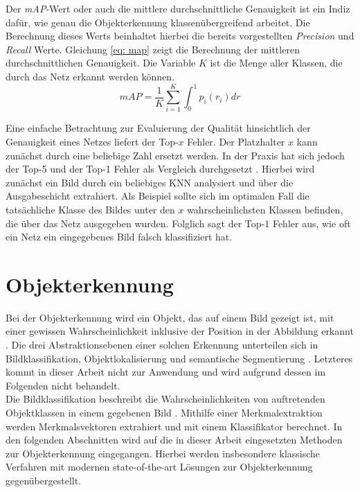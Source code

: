 		Der \textit{mAP}-Wert oder auch die mittlere durchschnittliche Genauigkeit ist ein Indiz dafür, wie genau die Objekterkennung klassenübergreifend arbeitet. Die Berechnung dieses Werts beinhaltet hierbei die bereits vorgestellten \textit{Precision} und \textit{Recall} Werte. Gleichung \ref{eq: map} zeigt die Berechnung der mittleren durchschnittlichen Genauigkeit. Die Variable $K$ ist die Menge aller Klassen, die durch das Netz erkannt werden können.  \\
		
		\begin{equation}
			mAP = \frac{1}{K}\sum_{i=1}^{K}\int_{0}^{1}p_i(r_i)dr
			\label{eq: map}
		\end{equation}\newpage
		
		Eine einfache Betrachtung zur Evaluierung der Qualität hinsichtlich der Genauigkeit eines Netzes liefert der Top-$x$ Fehler. Der Platzhalter $x$ kann zunächst durch eine beliebige Zahl ersetzt werden. In der Praxis hat sich jedoch der Top-5 und der Top-1 Fehler als Vergleich durchgesetzt \cite{cnnvergleich}. Hierbei wird zunächst ein Bild durch ein beliebiges KNN analysiert und über die Ausgabeschicht extrahiert. Als Beispiel sollte sich im optimalen Fall die tatsächliche Klasse des Bildes unter den $x$ wahrscheinlichsten Klassen befinden, die über das Netz ausgegeben wurden. Folglich sagt der Top-1 Fehler aus, wie oft ein Netz ein eingegebenes Bild falsch klassifiziert hat.
		
		
		
		
		
		
	\section{Objekterkennung}
	\label{sec: Objekterkennung}
	Bei der Objekterkennung wird ein Objekt, das auf einem Bild gezeigt ist, mit einer gewissen Wahrscheinlichkeit inklusive der Position in der Abbildung erkannt \cite{bildundobjekt}. Die drei Abstraktionsebenen einer solchen Erkennung unterteilen sich in Bildklassifikation, Objektlokalisierung und semantische Segmentierung \cite{bildundobjekt}. Letzteres kommt in dieser Arbeit nicht zur Anwendung und wird aufgrund dessen im Folgenden nicht behandelt.\\
	
	Die Bildklassifikation beschreibt die Wahrscheinlichkeiten von auftretenden Objektklassen in einem gegebenen Bild \cite{bildundobjekt}. Mithilfe einer Merkmalextraktion werden Merkmalsvektoren extrahiert und mit einem Klassifikator berechnet. In den folgenden Abschnitten wird auf die in dieser Arbeit eingesetzten Methoden zur Objekterkennung eingegangen. Hierbei werden insbesondere klassische Verfahren mit modernen state-of-the-art Lösungen zur Objekterkennung gegenübergestellt.  
	
